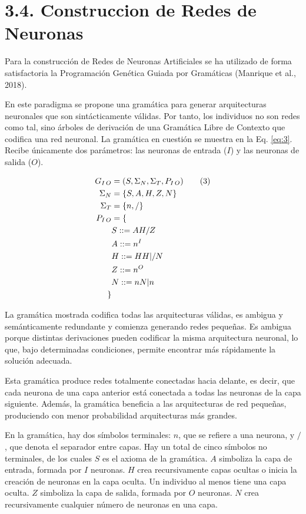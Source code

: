 \documentclass[spanish,a4paper,12pt,twoside]{report}
\begin{document}
    \section*{\Large 3.4. Construccion de Redes de Neuronas}
    Para la construcción de Redes de Neuronas Artificiales se ha utilizado de forma satisfactoria la Programación Genética Guiada por Gramáticas (Manrique et al., 2018). \par
    En este paradigma se propone una gramática para generar arquitecturas neuronales que son sintácticamente válidas. Por tanto, los individuos no son redes como tal, sino árboles de derivación de una Gramática Libre de Contexto que codifica una red neuronal. La gramática en cuestión se muestra en la Eq. \ref{eq:3}. Recibe únicamente dos parámetros: las neuronas de entrada ($I$) y las neuronas de salida ($O$). \par
    \begin{align*}
      G_{I\thinspace O} &= (S, \Sigma_{N}, \Sigma_{T}, P_{I\thinspace O}) \label{eq:3}\tag{3} \\
      \Sigma_{N} &= \{S, A, H, Z, N\} \\
      \Sigma_{T} &= \{n, /\} \\
      P_{I\thinspace O} &= \{ \\
      &S ::= AH/Z \\
      &A ::= n^I \\
      &H ::= HH | /N \\
      &Z ::= n^O \\
      &N ::= nN | n \\
      \}
    \end{align*} \par
      La gramática mostrada codifica todas las arquitecturas válidas, es ambigua y semánticamente redundante y comienza generando redes pequeñas. Es ambigua porque distintas derivaciones pueden codificar la misma arquitectura neuronal, lo que, bajo determinadas condiciones, permite encontrar más rápidamente la solución adecuada. \par
      Esta gramática produce redes totalmente conectadas hacia delante, es decir, que cada neurona de una capa anterior está conectada a todas las neuronas de la capa siguiente. Además, la gramática beneficia a las arquitecturas de red pequeñas, produciendo con menor probabilidad arquitecturas más grandes. \par
      En la gramática, hay dos símbolos terminales: $n$, que se refiere a una neurona, y $/$, que denota el separador entre capas. Hay un total de cinco símbolos no terminales, de los cuales $S$ es el axioma de la gramática. $A$ simboliza la capa de entrada, formada por $I$ neuronas. $H$ crea recursivamente capas ocultas o inicia la creación de neuronas en la capa oculta. Un individuo al menos tiene una capa oculta. $Z$ simboliza la capa de salida, formada por $O$ neuronas. $N$ crea recursivamente cualquier número de neuronas en una capa.
\end{document}
